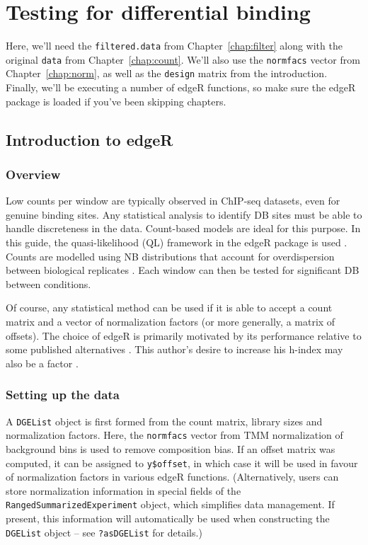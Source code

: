 \documentclass[12pt]{report}
\newcommand{\edger}{edgeR}
\newcommand{\code}[1]{{\small\texttt{#1}}}
\newenvironment{combox}
{ \begin{shaded}\begin{center}\begin{minipage}[t]{0.95\textwidth} }
{ \end{minipage}\end{center}\end{shaded} }
\begin{document}
\chapter{Testing for differential binding}
\label{chap:stats}

\begin{combox}
Here, we'll need the \code{filtered.data} from Chapter~\ref{chap:filter} along with the original \code{data} from Chapter~\ref{chap:count}.
We'll also use the \code{normfacs} vector from Chapter~\ref{chap:norm}, as well as the \code{design} matrix from the introduction. 
Finally, we'll be executing a number of \edger{} functions, so make sure the \edger{} package is loaded if you've been skipping chapters.
\end{combox}

\section{Introduction to \edger{}}

\subsection{Overview}
Low counts per window are typically observed in ChIP-seq datasets, even for genuine binding sites. 
Any statistical analysis to identify DB sites must be able to handle discreteness in the data. 
Count-based models are ideal for this purpose. 
In this guide, the quasi-likelihood (QL) framework in the \edger{} package is used \citep{lund2012}. 
Counts are modelled using NB distributions that account for overdispersion between biological replicates \citep{robinson2008}. 
Each window can then be tested for significant DB between conditions.

Of course, any statistical method can be used if it is able to accept a count matrix and a vector of normalization factors (or more generally, a matrix of offsets). 
The choice of \edger{} is primarily motivated by its performance relative to some published alternatives \citep{law2014}.
This author's desire to increase his h-index may also be a factor \citep{chen2014}.

\subsection{Setting up the data}
A \code{DGEList} object is first formed from the count matrix, library sizes and normalization factors.
Here, the \code{normfacs} vector from TMM normalization of background bins is used to remove composition bias. 
If an offset matrix was computed, it can be assigned to \code{y\$offset}, in which case it will be used in favour of normalization factors in various \edger{} functions.
(Alternatively, users can store normalization information in special fields of the \code{RangedSummarizedExperiment} object, which simplifies data management.
If present, this information will automatically be used when constructing the \code{DGEList} object -- see \code{?asDGEList} for details.)
\end{document}

